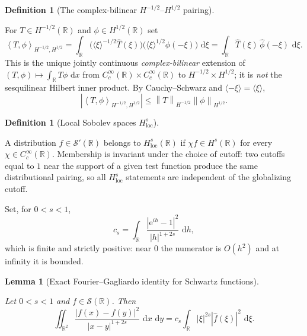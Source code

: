 \documentclass[11pt,oneside]{book}
\providecommand{\uses}[1]{}
\newtheorem{lemma}[theorem]{Lemma}
\theoremstyle{definition}
\newtheorem{definition}[theorem]{Definition}
\theoremstyle{remark}
\newcommand{\R}{\mathbb R}
\newcommand{\Ssch}{\mathcal S}
\newcommand{\1}{\mathbf 1}
\newcommand{\loc}{\mathrm{loc}}
\newcommand{\dd}{\,\mathrm d}
\newcommand{\norm}[1]{\left\lVert #1\right\rVert}
\newcommand{\abs}[1]{\left\lvert #1\right\rvert}
\newcommand{\pair}[2]{\left\langle #1,#2\right\rangle}
\newcommand{\e}{\mathrm e}
\begin{document}
\begin{definition}[The complex-bilinear $H^{-1/2}$--$H^{1/2}$ pairing]\label{def:Hs-neg-pairing}
\uses{def:Hs-space}
For $T\in H^{-1/2}(\R)$ and $\phi\in H^{1/2}(\R)$ set
\begin{equation}
 \pair{T}{\phi}_{H^{-1/2},H^{1/2}}
 =\int_{\R}\big(\langle\xi\rangle^{-1/2}\widehat T(\xi)\big)
          \big(\langle\xi\rangle^{1/2}\widehat\phi(-\xi)\big)\,\dd\xi
 =\int_{\R}\widehat T(\xi)\,\widehat\phi(-\xi)\,\dd\xi.
 \label{eq:Hs-neg-pairing}
\end{equation}
This is the unique jointly continuous \emph{complex-bilinear} extension of
$(T,\phi)\mapsto\int_\R T\phi\,\dd x$ from $C_c^\infty(\R)\times C_c^\infty(\R)$
to $H^{-1/2}\times H^{1/2}$; it is \emph{not} the sesquilinear Hilbert inner
product. By Cauchy--Schwarz and $\langle-\xi\rangle=\langle\xi\rangle$,
\begin{equation}
 \abs{\pair{T}{\phi}_{H^{-1/2},H^{1/2}}}
 \le\norm{T}_{H^{-1/2}}\norm{\phi}_{H^{1/2}}.
 \label{eq:Hs-neg-pairing-bound}
\end{equation}
\end{definition}

\begin{definition}[Local Sobolev spaces $H^{s}_{\loc}$]\label{def:Hs-loc}
\uses{def:Hs-space}
A distribution $f\in\Ssch'(\R)$ belongs to $H^{s}_{\loc}(\R)$ if
$\chi f\in H^{s}(\R)$ for every $\chi\in C_c^\infty(\R)$. Membership is
invariant under the choice of cutoff: two cutoffs equal to $1$ near the support
of a given test function produce the same distributional pairing, so all
$H^{s}_{\loc}$ statements are independent of the globalizing cutoff.
\end{definition}

Set, for $0<s<1$,
\[
 c_s=\int_{\R}\frac{\abs{\e^{ih}-1}^2}{\abs{h}^{1+2s}}\,\dd h,
\]
which is finite and strictly positive: near $0$ the numerator is $O(h^2)$ and at
infinity it is bounded.

\begin{lemma}[Exact Fourier--Gagliardo identity for Schwartz functions]\label{lem:gagliardo-fourier-identity}
\uses{def:Hs-space}
Let $0<s<1$ and $f\in\Ssch(\R)$. Then
\begin{equation}
 \iint_{\R^2}\frac{\abs{f(x)-f(y)}^2}{\abs{x-y}^{1+2s}}\,\dd x\,\dd y
 =c_s\int_\R\abs{\xi}^{2s}\abs{\widehat f(\xi)}^2\,\dd\xi.
 \label{eq:exact-gagliardo-fourier}
\end{equation}
\end{lemma}
\end{document}

